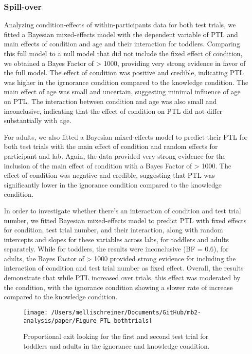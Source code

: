 \documentclass[
  english,
  man,floatsintext]{apa6}
\begin{document}
\hypertarget{spill-over}{%
\subsubsection{Spill-over}\label{spill-over}}

Analyzing condition-effects of within-participants data for both test trials, we fitted a Bayesian mixed-effects model with the dependent variable of PTL and main effects of condition and age and their interaction for toddlers. Comparing this full model to a null model that did not include the fixed effect of condition, we obtained a Bayes Factor of \textgreater{} 1000, providing very strong evidence in favor of the full model. The effect of condition was positive and credible, indicating PTL was higher in the igrnorance condition compared to the knowledge condition. The main effect of age was small and uncertain, suggesting minimal influence of age on PTL. The interaction between condition and age was also small and inconclusive, indicating that the effect of condition on PTL did not differ substantially with age.

For adults, we also fitted a Bayesian mixed-effects model to predict their PTL for both test trials with the main effect of condition and random effects for participant and lab. Again, the data provided very strong evidence for the inclusion of the main effect of condition with a Bayes Factor of \textgreater{} 1000. The effect of condition was negative and credible, suggesting that PTL was significantly lower in the ignorance condition compared to the knowledge condition.

In order to investigate whether there's an interaction of condition and test trial number, we fitted Bayesian mixed-effects model to predict PTL with fixed effects for condition, test trial number, and their interaction, along with random intercepts and slopes for these variables across labs, for toddlers and adults separately. While for toddlers, the results were inconclusive (BF = 0.6), for adults, the Bayes Factor of \textgreater{} 1000 provided strong evidence for including the interaction of condition and test trial number as fixed effect. Overall, the results demonstrate that while PTL increased over trials, this effect was moderated by the condition, with the ignorance condition showing a slower rate of increase compared to the knowledge condition.

\begin{figure}

{\centering \texttt{[image: /Users/mellischreiner/Documents/GitHub/mb2-analysis/paper/Figure\_PTL\_bothtrials]} 

}

\caption{Proportional exit looking for the first and second test trial for toddlers and adults in the ignorance and knowledge condition.}\label{fig:fig6}
\end{figure}
\end{document}
